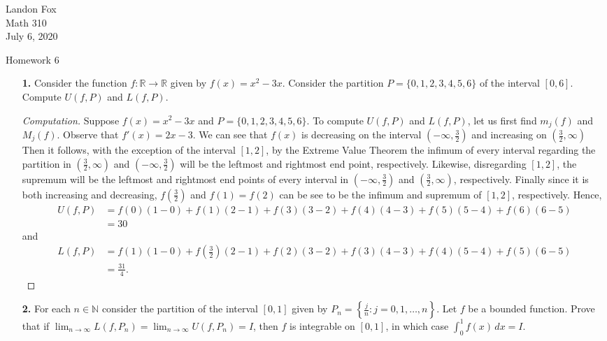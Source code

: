 \documentclass[ 12pt ]{article}
\begin{document}
\noindent Landon Fox \\
\noindent Math 310 \\
\noindent July 6, 2020

\begin{center}
\Large Homework 6
\end{center}

\begin{enumerate}
	\item[\textbf{1.}] Consider the function $f: \mathbb{R} \rightarrow \mathbb{R}$ given by $f(x) = x^2 - 3x$. Consider the partition $P = \{ 0, 1, 2, 3, 4, 5, 6 \}$
		of the interval $[0,6]$. Compute $U(f, P)$ and $L(f, P)$.

	\begin{proof}[Computation]\renewcommand{\qedsymbol}{}
		Suppose $f(x) = x^2 - 3x$ and $P = \{ 0, 1, 2, 3, 4, 5, 6 \}$. To compute $U(f, P)$ and $L(f, P)$, let us first find $m_j(f)$ and $M_j(f)$. Observe that $f'(x) =
		2x - 3$. We can see that $f(x)$ is decreasing on the interval $\left (-\infty, \frac{3}{2} \right )$ and increasing on $\left (\frac{3}{2}, \infty \right )$ Then it
		follows, with the exception of the interval $[1, 2]$, by the Extreme Value Theorem the infimum of every interval regarding the partition in $\left (\frac{3}{2},
		\infty \right )$ and $\left (-\infty, \frac{3}{2} \right )$ will be the leftmost and rightmost end point, respectively. Likewise, disregarding $[1, 2]$, the supremum
		will be the leftmost and rightmost end points of every interval in $\left (-\infty, \frac{3}{2} \right )$ and $\left (\frac{3}{2}, \infty \right )$, respectively.
		Finally since it is both increasing and decreasing, $f \left (\frac{3}{2} \right )$ and $f(1) = f(2)$ can be see to be the infimum and supremum of $[1, 2]$,
		respectively. Hence,
		\begin{align*}
			U(f, P) &= f(0)(1 - 0) + f(1)(2 - 1) + f(3)(3 - 2) + f(4)(4 - 3) + f(5)(5 - 4) + f(6)(6 - 5) \\
				&= 30
		\end{align*}
		and
		\begin{align*}
			L(f, P) &= f(1)(1 - 0) + f \left (\frac{3}{2} \right )(2 - 1) + f(2)(3 - 2) + f(3)(4 - 3) + f(4)(5 - 4) + f(5)(6 - 5) \\
				&= \frac{31}{4}.
		\end{align*}
	\end{proof}


	\item[\textbf{2.}] For each $n \in \mathbb{N}$ consider the partition of the interval $[0,1]$ given by $P_n = \left \{ \frac{j}{n}: j = 0, 1, \hdots, n \right \}$. Let
		$f$ be a bounded function. Prove that if $\lim_{n \rightarrow \infty} L(f, P_n) = \lim_{n \rightarrow \infty} U(f, P_n) = I$, then $f$ is integrable on $[0,1]$, in
		which case $\int_0^1 f(x)\, dx = I$.


\end{enumerate}
\end{document}
